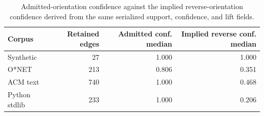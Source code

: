\begin{table}[t]
  \caption{Admitted-orientation confidence against the implied reverse-orientation confidence derived from the same serialized support, confidence, and lift fields.}
  \label{tab:directional-asymmetry}
  \centering
  \small
  \begin{tabular}{lrrr}
    \toprule
    Corpus & Retained edges & Admitted conf. median & Implied reverse conf. median \\
    \midrule
    Synthetic & 27 & 1.000 & 1.000 \\
    O*NET & 213 & 0.806 & 0.351 \\
    ACM text & 740 & 1.000 & 0.468 \\
    Python stdlib & 233 & 1.000 & 0.206 \\
    \bottomrule
  \end{tabular}
\end{table}
